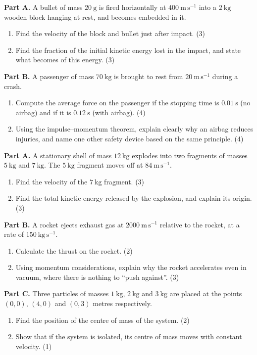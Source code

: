 \documentclass[11pt]{article}
\begin{document}
\begin{exercice}
\textbf{Part A.} A bullet of mass $20\ \mathrm{g}$ is fired horizontally at $400\ \mathrm{m\,s^{-1}}$ into a $2\ \mathrm{kg}$ wooden block hanging at rest, and becomes embedded in it.
\begin{enumerate}
\item Find the velocity of the block and bullet just after impact. \hfill (3)
\item Find the fraction of the initial kinetic energy lost in the impact, and state what becomes of this energy. \hfill (3)
\end{enumerate}
\textbf{Part B.} A passenger of mass $70\ \mathrm{kg}$ is brought to rest from $20\ \mathrm{m\,s^{-1}}$ during a crash.
\begin{enumerate}
\item[(c)] Compute the average force on the passenger if the stopping time is $0.01\ \mathrm{s}$ (no airbag) and if it is $0.12\ \mathrm{s}$ (with airbag). \hfill (4)
\item[(d)] Using the impulse--momentum theorem, explain clearly why an airbag reduces injuries, and name one other safety device based on the same principle. \hfill (4)
\end{enumerate}
\end{exercice}

\begin{exercice}
\textbf{Part A.} A stationary shell of mass $12\ \mathrm{kg}$ explodes into two fragments of masses $5\ \mathrm{kg}$ and $7\ \mathrm{kg}$. The $5\ \mathrm{kg}$ fragment moves off at $84\ \mathrm{m\,s^{-1}}$.
\begin{enumerate}
\item Find the velocity of the $7\ \mathrm{kg}$ fragment. \hfill (3)
\item Find the total kinetic energy released by the explosion, and explain its origin. \hfill (3)
\end{enumerate}
\textbf{Part B.} A rocket ejects exhaust gas at $2000\ \mathrm{m\,s^{-1}}$ relative to the rocket, at a rate of $150\ \mathrm{kg\,s^{-1}}$.
\begin{enumerate}
\item[(c)] Calculate the thrust on the rocket. \hfill (2)
\item[(d)] Using momentum considerations, explain why the rocket accelerates even in vacuum, where there is nothing to ``push against''. \hfill (3)
\end{enumerate}
\textbf{Part C.} Three particles of masses $1\ \mathrm{kg}$, $2\ \mathrm{kg}$ and $3\ \mathrm{kg}$ are placed at the points $(0,0)$, $(4,0)$ and $(0,3)$ metres respectively.
\begin{enumerate}
\item[(e)] Find the position of the centre of mass of the system. \hfill (2)
\item[(f)] Show that if the system is isolated, its centre of mass moves with constant velocity. \hfill (1)
\end{enumerate}
\end{exercice}
\end{document}
